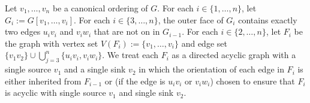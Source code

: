 \documentclass{patmorin}
\begin{document}
Let $v_1,\ldots,v_n$ be a canonical ordering of $G$. For each $i\in\{1,\ldots,n\}$, let $G_i:=G[v_1,\ldots,v_i]$.  For each $i\in\{3,\ldots,n\}$, the outer face of $G_i$ contains exactly two edges $u_iv_i$ and $v_iw_i$ that are not on in $G_{i-1}$.  For each $i\in\{2,\ldots,n\}$, let $F_i$ be the graph with vertex set $V(F_i):=\{v_1,\ldots,v_i\}$ and edge set $\{v_1v_2\}\cup\bigcup_{j=3}^n\{u_iv_i,v_iw_i\}$.  We treat each $F_i$ as a directed acyclic graph with a single source $v_1$ and a single sink $v_2$ in which the orientation of each edge in $F_i$ is either inherited from $F_{i-1}$ or (if the edge is $u_iv_i$ or $v_iw_i$) chosen to ensure that $F_i$ is acyclic with single source $v_1$ and single sink $v_2$.
\end{document}
